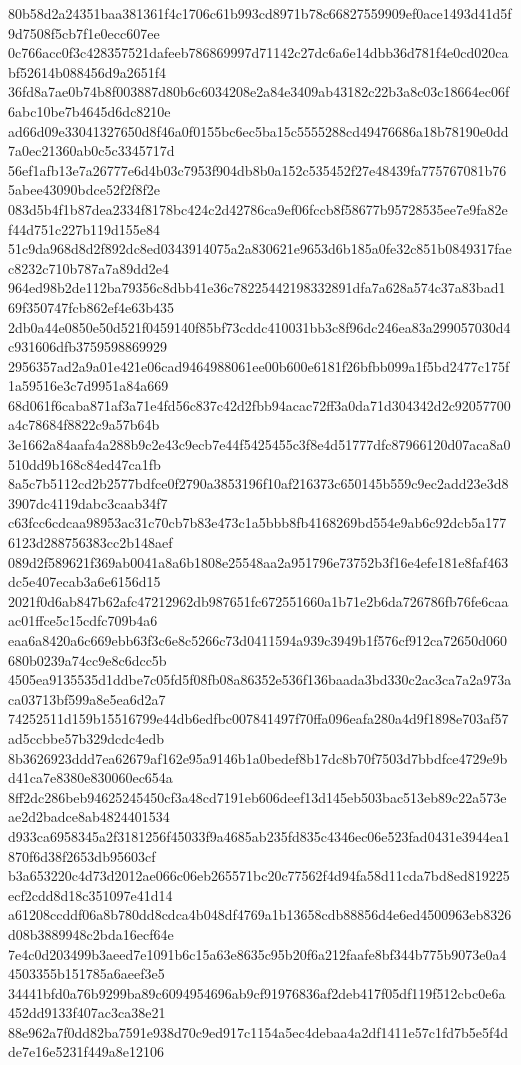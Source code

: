 {80b58d2a24351baa381361f4c1706c61b993cd8971b78c66827559909ef0ace1493d41d5f9d7508f5cb7f1e0ecc607ee
0c766acc0f3c428357521dafeeb786869997d71142c27dc6a6e14dbb36d781f4e0cd020cabf52614b088456d9a2651f4
36fd8a7ae0b74b8f003887d80b6c6034208e2a84e3409ab43182c22b3a8c03c18664ec06f6abc10be7b4645d6dc8210e
ad66d09e33041327650d8f46a0f0155bc6ec5ba15c5555288cd49476686a18b78190e0dd7a0ec21360ab0c5c3345717d
56ef1afb13e7a26777e6d4b03c7953f904db8b0a152c535452f27e48439fa775767081b765abee43090bdce52f2f8f2e
083d5b4f1b87dea2334f8178bc424c2d42786ca9ef06fccb8f58677b95728535ee7e9fa82ef44d751c227b119d155e84
51c9da968d8d2f892dc8ed0343914075a2a830621e9653d6b185a0fe32c851b0849317faec8232c710b787a7a89dd2e4
964ed98b2de112ba79356c8dbb41e36c78225442198332891dfa7a628a574c37a83bad169f350747fcb862ef4e63b435
2db0a44e0850e50d521f0459140f85bf73cddc410031bb3c8f96dc246ea83a299057030d4c931606dfb3759598869929
2956357ad2a9a01e421e06cad9464988061ee00b600e6181f26bfbb099a1f5bd2477c175f1a59516e3c7d9951a84a669
68d061f6caba871af3a71e4fd56c837c42d2fbb94acac72ff3a0da71d304342d2c92057700a4c78684f8822c9a57b64b
3e1662a84aafa4a288b9c2e43c9ecb7e44f5425455c3f8e4d51777dfc87966120d07aca8a0510dd9b168c84ed47ca1fb
8a5c7b5112cd2b2577bdfce0f2790a3853196f10af216373c650145b559c9ec2add23e3d83907dc4119dabc3caab34f7
c63fcc6cdcaa98953ac31c70cb7b83e473c1a5bbb8fb4168269bd554e9ab6c92dcb5a1776123d288756383cc2b148aef
089d2f589621f369ab0041a8a6b1808e25548aa2a951796e73752b3f16e4efe181e8faf463dc5e407ecab3a6e6156d15
2021f0d6ab847b62afc47212962db987651fc672551660a1b71e2b6da726786fb76fe6caaac01ffce5c15cdfc709b4a6
eaa6a8420a6c669ebb63f3c6e8c5266c73d0411594a939c3949b1f576cf912ca72650d060680b0239a74cc9e8c6dcc5b
4505ea9135535d1ddbe7c05fd5f08fb08a86352e536f136baada3bd330c2ac3ca7a2a973aca03713bf599a8e5ea6d2a7
74252511d159b15516799e44db6edfbc007841497f70ffa096eafa280a4d9f1898e703af57ad5ccbbe57b329dcdc4edb
8b3626923ddd7ea62679af162e95a9146b1a0bedef8b17dc8b70f7503d7bbdfce4729e9bd41ca7e8380e830060ec654a
8ff2dc286beb94625245450cf3a48cd7191eb606deef13d145eb503bac513eb89c22a573eae2d2badce8ab4824401534
d933ca6958345a2f3181256f45033f9a4685ab235fd835c4346ec06e523fad0431e3944ea1870f6d38f2653db95603cf
b3a653220c4d73d2012ae066c06eb265571bc20c77562f4d94fa58d11cda7bd8ed819225ecf2cdd8d18c351097e41d14
a61208ccddf06a8b780dd8cdca4b048df4769a1b13658cdb88856d4e6ed4500963eb8326d08b3889948c2bda16ecf64e
7e4c0d203499b3aeed7e1091b6c15a63e8635c95b20f6a212faafe8bf344b775b9073e0a44503355b151785a6aeef3e5
34441bfd0a76b9299ba89c6094954696ab9cf91976836af2deb417f05df119f512cbc0e6a452dd9133f407ac3ca38e21
88e962a7f0dd82ba7591e938d70c9ed917c1154a5ec4debaa4a2df1411e57c1fd7b5e5f4dde7e16e5231f449a8e12106
}

